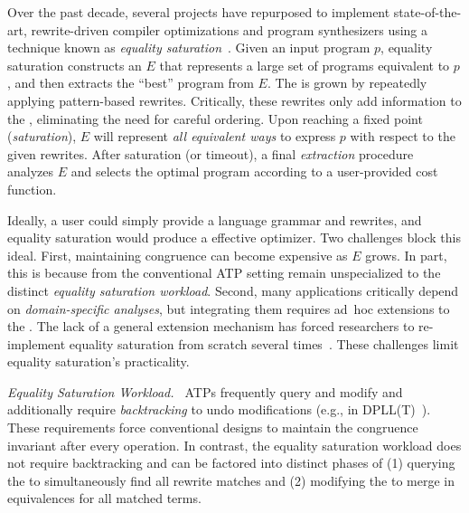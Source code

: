 Over the past decade, several projects have repurposed \egraphs
  to implement state-of-the-art, rewrite-driven
  compiler optimizations and program synthesizers
  using a technique known as \textit{equality saturation}~\cite{
    denali, eqsat, eqsat-llvm, szalinski, yogo-pldi20, spores, herbie}.
Given an input program $p$,
  equality saturation constructs an \egraph $E$ that
  represents a large set of programs equivalent to $p$,
  and then extracts the ``best'' program from $E$.
The \egraph is grown by repeatedly applying
  pattern-based rewrites. %
Critically, these rewrites only add information to the \egraph,
  eliminating the need for careful ordering.
Upon reaching a fixed point (\textit{saturation}),
  $E$ will represent \textit{all equivalent ways} to
  express $p$ with respect to the given rewrites.
After saturation (or timeout),
  a final \textit{extraction} procedure
  analyzes $E$ and selects the
  optimal program according to
  a user-provided cost function.

Ideally, a user could simply provide
  a language grammar and rewrites,
  and equality saturation would produce a effective optimizer.
Two challenges block this ideal.
First, maintaining congruence can become expensive as $E$ grows.
In part, this is because \egraphs from the conventional ATP setting
  remain unspecialized to the distinct \textit{equality saturation workload}.
Second, many applications critically depend on
  \textit{domain-specific analyses}, but
  integrating them requires ad~hoc extensions to the \egraph.
The lack of a general extension mechanism
  has forced researchers to re-implement
  equality saturation from scratch several times~\cite{herbie, eqsat, wu_siga19}.
These challenges limit equality saturation's practicality.

\textit{Equality Saturation Workload. $\,$}
%
ATPs frequently query and modify \egraphs and
  additionally require \textit{backtracking} to
  undo modifications (e.g., in  DPLL(T)~\cite{dpll}).
These requirements force conventional \egraph designs
  to maintain the congruence invariant after every operation.
In contrast,
  the equality saturation workload does not require backtracking and
  can be factored into distinct phases of
  (1) querying the \egraph to simultaneously find all rewrite matches and
  (2) modifying the \egraph to merge in equivalences for all matched terms.

